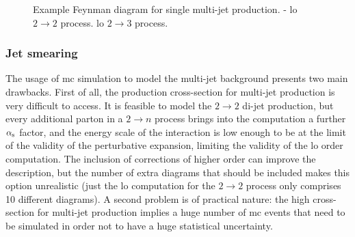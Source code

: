 \begin{figure}[h]
\centering 
{}
\caption{Example Feynman diagram for single multi-jet production. - \gls{lo} $2 \to 2$ process. 
 \gls{lo} $2 \to 3$ process.}\label{fig:qcd_prod}
\end{figure}

\subsubsection*{Jet smearing}
\label{sec:jet_smearing}

The usage of \gls{mc} simulation to model the multi-jet background presents two main drawbacks.
First of all, the production cross-section for multi-jet production is very difficult to access. 
It is feasible to model the $2 \to 2$ di-jet production, 
but every additional parton in a $2 \to n$ process brings into the computation a further $\alpha_{\rm{s}}$ factor, 
and the energy scale of the interaction is low enough to be at the limit of the validity of the perturbative expansion, limiting the validity of the \gls{lo} order computation. The inclusion of corrections of higher order can improve the description, but the number of extra diagrams that should be included makes this option unrealistic (just the \gls{lo} computation for the $2 \to 2$ process only comprises 10 different diagrams).
A second problem is of practical nature: the high cross-section for multi-jet production implies a huge number of \gls{mc} events that need to be simulated in order not to have a huge statistical uncertainty. 

